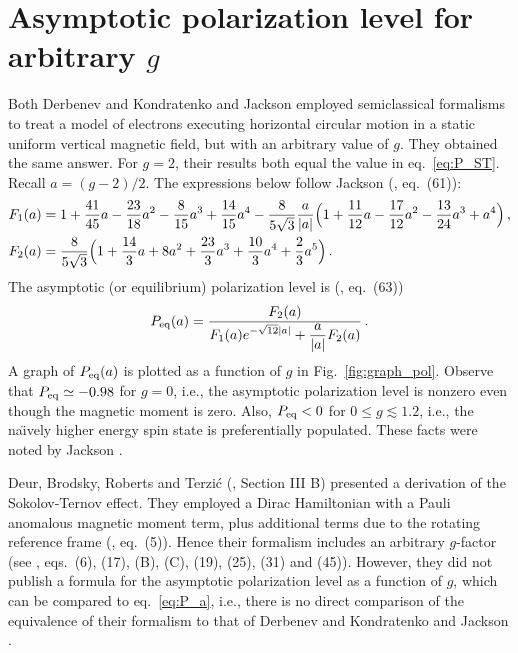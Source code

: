 \documentclass[review]{elsarticle}
\theoremstyle{plain}
\begin{document}
\setcounter{equation}{0}
\section{Asymptotic polarization level for arbitrary $g$}\label{sec:P_a}
Both Derbenev and Kondratenko \cite{DK73} and Jackson \cite{JacksonRMP} employed semiclassical formalisms 
to treat a model of electrons executing horizontal circular motion in a static uniform vertical magnetic field, but with an arbitrary value of $g$.
They obtained the same answer. For $g=2$, their results both equal the value in eq.~\eqref{eq:P_ST}.
Recall $a=(g-2)/2$.
The expressions below follow Jackson (\cite{JacksonRMP}, eq.~(61)):
\begin{equation}
\begin{split}
  F_1(a) &= 1 +\frac{41}{45}a -\frac{23}{18}a^2 -\frac{8}{15}a^3 +\frac{14}{15}a^4
  -\frac{8}{5\sqrt3}\frac{a}{|a|}\Bigl(1 +\frac{11}{12}a -\frac{17}{12}a^2 -\frac{13}{24}a^3 +a^4\Bigr) \,,
\\
F_2(a) &= \frac{8}{5\sqrt3}\Bigl(1 +\frac{14}{3}a +8a^2 +\frac{23}{3}a^3 +\frac{10}{3}a^4 +\frac{2}{3}a^5\Bigr) \,.
\end{split}
\end{equation}
The asymptotic (or equilibrium) polarization level is (\cite{JacksonRMP}, eq.~(63))
\begin{equation}
\label{eq:P_a}  
  P_{\rm eq}(a) = \frac{F_2(a)}{\displaystyle F_1(a)e^{-\sqrt{12}|a|} +\frac{a}{|a|}F_2(a)} \,.
\end{equation}
A graph of $P_{\rm eq}(a)$ is plotted as a function of $g$ in Fig.~\ref{fig:graph_pol}.
Observe that $P_{\rm eq}\simeq-0.98$ for $g=0$, i.e., the asymptotic polarization level is nonzero even though the magnetic moment is zero.
Also, $P_{\rm eq}<0$ for $0\le g \lesssim 1.2$, i.e., the na{\"\i}vely higher energy spin state is preferentially populated.
These facts were noted by Jackson \cite{JacksonRMP}.

Deur, Brodsky, Roberts and Terzi{\'c} (\cite{RUE}, Section III B) presented a derivation of the Sokolov-Ternov effect.
They employed a Dirac Hamiltonian with a Pauli anomalous magnetic moment term, plus additional terms due to the rotating reference frame (\cite{RUE}, eq.~(5)).
Hence their formalism includes an arbitrary $g$-factor (see \cite{RUE}, eqs.~(6), (17), (B), (C), (19), (25), (31) and (45)).
However, they did not publish a formula for the asymptotic polarization level as a function of $g$, which can be compared to eq.~\eqref{eq:P_a},
i.e., there is no direct comparison of the equivalence of their formalism to that of Derbenev and Kondratenko \cite{DK73} and Jackson \cite{JacksonRMP}.
\end{document}
